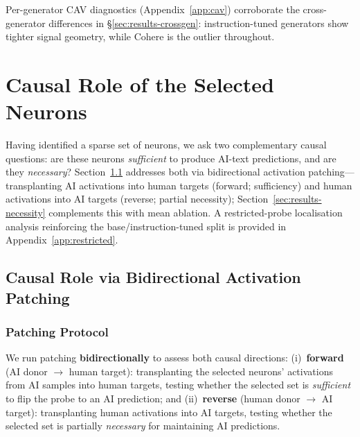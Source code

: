 \documentclass[11pt]{article}
\begin{document}
Per-generator CAV diagnostics (Appendix~\ref{app:cav}) corroborate the cross-generator differences in §\ref{sec:results-crossgen}: instruction-tuned generators show tighter signal geometry, while Cohere is the outlier throughout.

\section{Causal Role of the Selected Neurons}
\label{sec:results-causal}

Having identified a sparse set of neurons, we ask two complementary causal questions: are these neurons \textit{sufficient} to produce AI-text predictions, and are they \textit{necessary}? Section~\ref{sec:results-patching} addresses both via bidirectional activation patching---transplanting AI activations into human targets (forward; sufficiency) and human activations into AI targets (reverse; partial necessity); Section~\ref{sec:results-necessity} complements this with mean ablation. A restricted-probe localisation analysis reinforcing the base/instruction-tuned split is provided in Appendix~\ref{app:restricted}.

\subsection{Causal Role via Bidirectional Activation Patching}
\label{sec:results-patching}

\subsubsection{Patching Protocol}
\label{sec:patching-protocol}

We run patching \textbf{bidirectionally} to assess both causal directions: (i)~\textbf{forward} (AI donor $\to$ human target): transplanting the selected neurons' activations from AI samples into human targets, testing whether the selected set is \textit{sufficient} to flip the probe to an AI prediction; and (ii)~\textbf{reverse} (human donor $\to$ AI target): transplanting human activations into AI targets, testing whether the selected set is partially \textit{necessary} for maintaining AI predictions.
\end{document}
